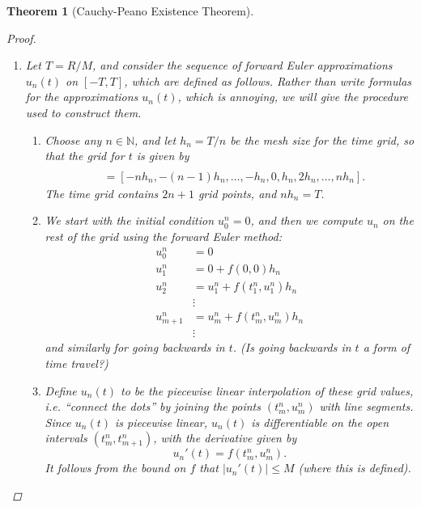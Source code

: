 \documentclass[12pt]{amsart}         %
\newtheorem{theorem}{Theorem}[section]
\theoremstyle{remark}
\newcommand{\N}{\mathbb{N}}
\begin{document}
\begin{theorem}[Cauchy-Peano Existence Theorem]
\begin{proof}
\begin{enumerate}
    \[
    u(t) = \int_0^t f(s, u(s))ds.
    \]
    \item Let $T = R/M$, and consider the sequence of forward Euler approximations $u_n(t)$ on $[-T, T]$, which are defined as follows. Rather than write formulas for the approximations $u_n(t)$, which is annoying, we will give the procedure used to construct them.
    \begin{enumerate}
        \item Choose any $n \in \N$, and let $h_n = T/n$ be the mesh size for the time grid, so that the grid for $t$ is given by
        \begin{align*}
        [-t_n^n, -t_{n-1}^n, &\dots, -t_1^n, 0, t_1^n, t_2^n, \dots, t_n^n] \\
         &= [-n h_n, -(n-1)h_n, \dots, -h_n, 0, h_n, 2 h_n, \dots, n h_n ].
        \end{align*}
        The time grid contains $2n + 1$ grid points, and $n h_n = T$.
        \item We start with the initial condition $u_0^n = 0$, and then we compute $u_n$ on the rest of the grid using the forward Euler method:
        \begin{align*}
            u_0^n &= 0 \\
            u_1^n &=  0 + f(0, 0) h_n \\
            u_2^n &=  u_1^n + f(t_1^n, u_1^n) h_n \\
            & \vdots \\
            u_{m+1}^n &= u_m^n + f(t_m^n, u_m^n) h_n \\
            & \vdots
        \end{align*}
        and similarly for going backwards in $t$. (Is going backwards in $t$ a form of time travel?)
        \item Define $u_n(t)$ to be the piecewise linear interpolation of these grid values, i.e. ``connect the dots'' by joining the points $(t_m^n,u_m^n)$ with line segments. Since $u_n(t)$ is piecewise linear, $u_n(t)$ is differentiable on the open intervals $(t_m^n, t_{m+1}^n)$, with the derivative given by
        \[
        u_n'(t) = f(t_m^n, u_m^n).
        \]
        It follows from the bound on $f$ that $|u_n'(t)| \leq M$ (where this is defined).
    \end{enumerate}
    

\end{enumerate}
\end{proof}
\end{theorem}
\end{document}
